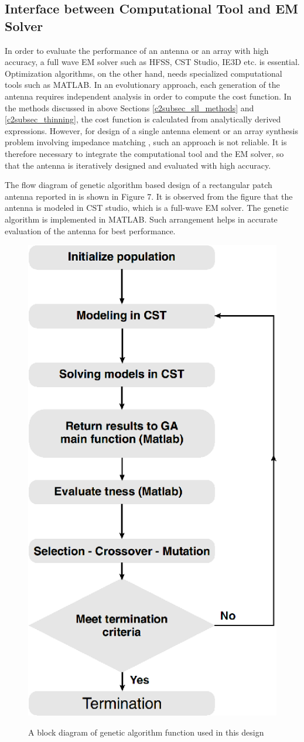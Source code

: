 \subsection{Interface between Computational Tool and EM Solver} \label{c2subsec_tools}
In order to evaluate the performance of an antenna or an array with high accuracy, a full wave EM solver such as HFSS, CST Studio, IE3D etc. is essential. Optimization algorithms, on the other hand, needs specialized computational tools such as MATLAB. In an evolutionary approach, each generation of the antenna requires independent analysis in order to compute the cost function. In the methods discussed in above Sections \ref{c2subsec_sll_methods} and \ref{c2subsec_thinning}, the cost function is calculated from analytically derived expressions. However, for design of a single antenna element \cite{patch_miniaturize_ga, optPatch, freqReconfCogn} or an array synthesis problem involving impedance matching \cite{arraySynth1}, such an approach is not reliable. It is therefore necessary to integrate the computational tool and the EM solver, so that the antenna is iteratively designed and evaluated with high accuracy.

The flow diagram of genetic algorithm based design of a rectangular patch antenna reported in \cite{patch_miniaturize_ga} is shown in Figure 7. It is observed from the figure that the antenna is modeled in CST studio, which is a full-wave EM solver. The genetic algorithm is implemented in MATLAB. Such arrangement helps in accurate evaluation of the antenna for best performance.

\begin{figure}
  \centering
  \includegraphics[width=0.4\linewidth]{fig_2_7.eps}\\
  \caption[A block diagram of genetic algorithm function used in this design]{A block diagram of genetic algorithm function used in this design \cite{patch_miniaturize_ga}} \label{fig_2_7}
\end{figure}

